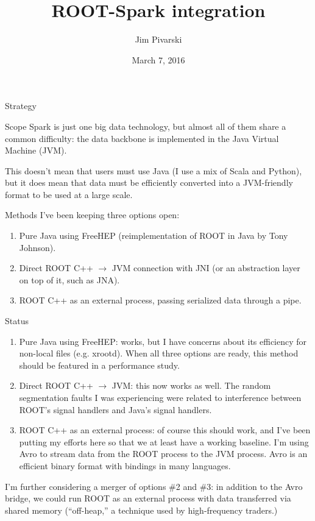 \documentclass{beamer}
\title[2016-03-07-spark]{ROOT-Spark integration}
\author{Jim Pivarski}
\institute{Princeton Univeristy --- DIANA}
\date{March 7, 2016}
\begin{document}
\begin{frame}
  \titlepage
\end{frame}


\begin{frame}{Strategy}
\begin{block}{Scope}
Spark is just one big data technology, but almost all of them share a common difficulty: the data backbone is implemented in the Java Virtual Machine (JVM).

\vspace{0.2 cm}
This doesn't mean that users must use Java (I use a mix of Scala and Python), but it does mean that data must be efficiently converted into a JVM-friendly format to be used at a large scale.
\end{block}

\begin{block}{Methods}
I've been keeping three options open:
\begin{enumerate}
\item Pure Java using FreeHEP (reimplementation of ROOT in Java by Tony Johnson).
\item Direct ROOT C++ $\to$ JVM connection with JNI (or an abstraction layer on top of it, such as JNA).
\item ROOT C++ as an external process, passing serialized data through a pipe.
\end{enumerate}
\end{block}
\end{frame}

\begin{frame}{Status}
\begin{enumerate}
\item Pure Java using FreeHEP: works, but I have concerns about its efficiency for non-local files (e.g. xrootd). When all three options are ready, this method should be featured in a performance study.

\item Direct ROOT C++ $\to$ JVM: this now works as well. The random segmentation faults I was experiencing were related to interference between ROOT's signal handlers and Java's signal handlers.

\item ROOT C++ as an external process: of course this should work, and I've been putting my efforts here so that we at least have a working baseline. I'm using Avro to stream data from the ROOT process to the JVM process. Avro is an efficient binary format with bindings in many languages.
\end{enumerate}

I'm further considering a merger of options \#2 and \#3: in addition to the Avro bridge, we could run ROOT as an external process with data transferred via shared memory (``off-heap,'' a technique used by high-frequency traders.)

\end{frame}
\end{document}
